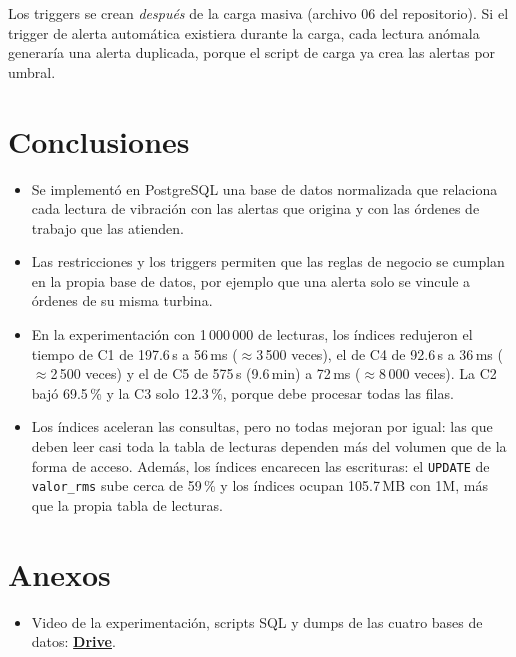 \documentclass[11pt,a4paper]{article}
\begin{document}
Los triggers se crean \emph{después} de la carga masiva (archivo 06 del
repositorio). Si el trigger de alerta automática existiera durante la carga,
cada lectura anómala generaría una alerta duplicada, porque el script de carga
ya crea las alertas por umbral.

\newpage


\newpage
\section{Conclusiones}

\begin{itemize}
    \item Se implementó en PostgreSQL una base de datos normalizada que
    relaciona cada lectura de vibración con las alertas que origina y con las
    órdenes de trabajo que las atienden.
    \item Las restricciones y los triggers permiten que las reglas de negocio se
    cumplan en la propia base de datos, por ejemplo que una alerta solo se
    vincule a órdenes de su misma turbina.
    \item En la experimentación con 1\,000\,000 de lecturas, los índices
    redujeron el tiempo de C1 de 197.6\,s a 56\,ms ($\approx$3\,500 veces), el de
    C4 de 92.6\,s a 36\,ms ($\approx$2\,500 veces) y el de C5 de 575\,s (9.6\,min)
    a 72\,ms ($\approx$8\,000 veces). La C2 bajó 69.5\,\% y la C3 solo 12.3\,\%,
    porque debe procesar todas las filas.
    \item Los índices aceleran las consultas, pero no todas mejoran por igual:
    las que deben leer casi toda la tabla de lecturas dependen más del volumen
    que de la forma de acceso. Además, los índices encarecen las escrituras: el
    \texttt{UPDATE} de \texttt{valor\_rms} sube cerca de 59\,\% y los índices
    ocupan 105.7\,MB con 1M, más que la propia tabla de lecturas.
\end{itemize}

\section{Anexos}

\begin{itemize}
    \item Video de la experimentación, scripts SQL y dumps de las cuatro bases de datos:
    \href{https://drive.google.com/drive/folders/1-aAKpmjW4eu0EVGxjQT4F3AjlzIZUl-k?usp=sharing}{\textbf{Drive}}.
\end{itemize}
\end{document}
